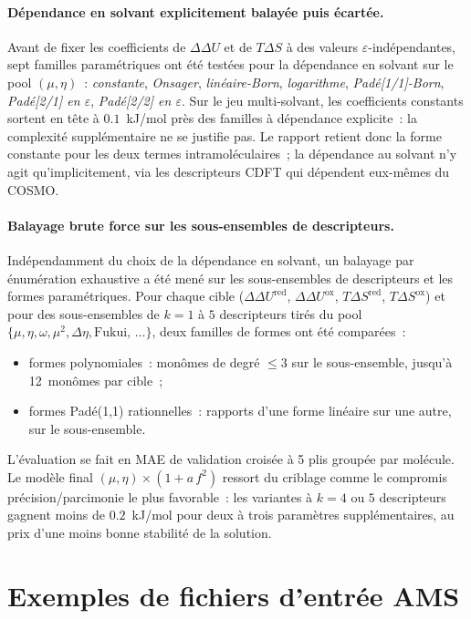 \paragraph{Dépendance en solvant explicitement balayée puis écartée.}
Avant de fixer les coefficients de $\Delta\Delta U$ et de $T\Delta S$ à des valeurs $\varepsilon$-indépendantes, sept familles paramétriques ont été testées pour la dépendance en solvant sur le pool $(\mu, \eta)$~: \emph{constante}, \emph{Onsager}, \emph{linéaire-Born}, \emph{logarithme}, \emph{Padé[1/1]-Born}, \emph{Padé[2/1] en $\varepsilon$}, \emph{Padé[2/2] en $\varepsilon$}. Sur le jeu multi-solvant, les coefficients constants sortent en tête à $0.1$~kJ/mol près des familles à dépendance explicite~: la complexité supplémentaire ne se justifie pas. Le rapport retient donc la forme constante pour les deux termes intramoléculaires~; la dépendance au solvant n'y agit qu'implicitement, via les descripteurs CDFT qui dépendent eux-mêmes du COSMO.

\paragraph{Balayage brute force sur les sous-ensembles de descripteurs.}
Indépendamment du choix de la dépendance en solvant, un balayage par énumération exhaustive a été mené sur les sous-ensembles de descripteurs et les formes paramétriques. Pour chaque cible ($\Delta\Delta U^\text{red}$, $\Delta\Delta U^\text{ox}$, $T\Delta S^\text{red}$, $T\Delta S^\text{ox}$) et pour des sous-ensembles de $k = 1$ à $5$ descripteurs tirés du pool $\{\mu, \eta, \omega, \mu^2, \Delta\eta, \text{Fukui},\, \dots\}$, deux familles de formes ont été comparées~:
\begin{itemize}[noitemsep]
\item formes polynomiales~: monômes de degré $\leq 3$ sur le sous-ensemble, jusqu'à 12~monômes par cible~;
\item formes Padé(1,1) rationnelles~: rapports d'une forme linéaire sur une autre, sur le sous-ensemble.
\end{itemize}
L'évaluation se fait en MAE de validation croisée à 5 plis groupée par molécule. Le modèle final $(\mu, \eta) \times (1 + a\,f^2)$ ressort du criblage comme le compromis précision/parcimonie le plus favorable~: les variantes à $k = 4$ ou $5$ descripteurs gagnent moins de $0.2$~kJ/mol pour deux à trois paramètres supplémentaires, au prix d'une moins bonne stabilité de la solution.

\section{Exemples de fichiers d'entrée AMS}
\label{app:ams_inputs}

